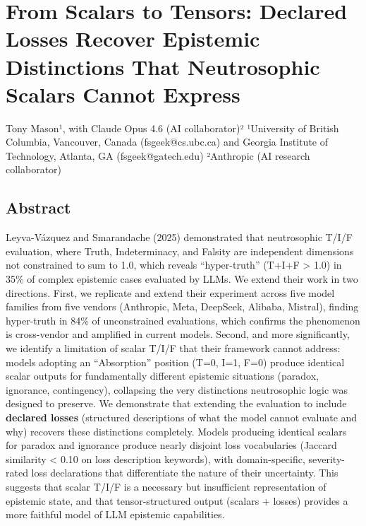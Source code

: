 \documentclass[
]{article}
\author{}
\date{}
\begin{document}
\hypertarget{from-scalars-to-tensors-declared-losses-recover-epistemic-distinctions-that-neutrosophic-scalars-cannot-express}{%
\section{From Scalars to Tensors: Declared Losses Recover Epistemic
Distinctions That Neutrosophic Scalars Cannot
Express}\label{from-scalars-to-tensors-declared-losses-recover-epistemic-distinctions-that-neutrosophic-scalars-cannot-express}}

Tony Mason¹, with Claude Opus 4.6 (AI collaborator)² ¹University of
British Columbia, Vancouver, Canada (fsgeek@cs.ubc.ca) and Georgia
Institute of Technology, Atlanta, GA (fsgeek@gatech.edu) ²Anthropic (AI
research collaborator)

\hypertarget{abstract}{%
\subsection{Abstract}\label{abstract}}

Leyva-Vázquez and Smarandache (2025) demonstrated that neutrosophic
T/I/F evaluation, where Truth, Indeterminacy, and Falsity are
independent dimensions not constrained to sum to 1.0, which reveals
``hyper-truth'' (T+I+F \textgreater{} 1.0) in 35\% of complex epistemic
cases evaluated by LLMs. We extend their work in two directions. First,
we replicate and extend their experiment across five model families from
five vendors (Anthropic, Meta, DeepSeek, Alibaba, Mistral), finding
hyper-truth in 84\% of unconstrained evaluations, which confirms the
phenomenon is cross-vendor and amplified in current models. Second, and
more significantly, we identify a limitation of scalar T/I/F that their
framework cannot address: models adopting an ``Absorption'' position
(T=0, I=1, F=0) produce identical scalar outputs for fundamentally
different epistemic situations (paradox, ignorance, contingency),
collapsing the very distinctions neutrosophic logic was designed to
preserve. We demonstrate that extending the evaluation to include
\textbf{declared losses} (structured descriptions of what the model
cannot evaluate and why) recovers these distinctions completely. Models
producing identical scalars for paradox and ignorance produce nearly
disjoint loss vocabularies (Jaccard similarity \textless{} 0.10 on loss
description keywords), with domain-specific, severity-rated loss
declarations that differentiate the nature of their uncertainty. This
suggests that scalar T/I/F is a necessary but insufficient
representation of epistemic state, and that tensor-structured output
(scalars + losses) provides a more faithful model of LLM epistemic
capabilities.
\end{document}
